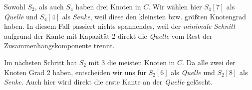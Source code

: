 \begin{center}
\end{center}

Sowohl $S_2$, als auch $S_4$ haben drei Knoten in $C$. Wir wählen hier $S_4[7]$ als \emph{Quelle} und $S_4[4]$ als \emph{Senke}, weil diese den kleinsten bzw. größten Knotengrad haben. In diesem Fall passiert nichts spannendes, weil der \emph{minimale Schnitt} aufgrund der Kante mit Kapazität 2 direkt die \emph{Quelle} vom Rest der Zusammenhangskomponente trennt.

Im nächsten Schritt hat $S_2$ mit 3 die meisten Knoten in $C$. Da alle zwei der Knoten Grad 2 haben, entscheiden wir uns für $S_2[6]$ als \emph{Quelle} und $S_2[8]$ als \emph{Senke}. Auch hier wird direkt die erste Kante an der \emph{Quelle} gelöscht.

